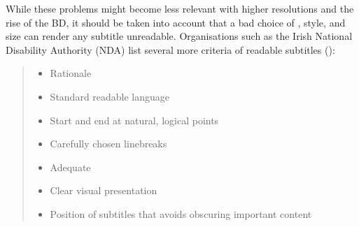 While these problems might become less relevant with higher resolutions and the rise of the BD, it should be taken into account that a bad choice of , style, and size can render any subtitle unreadable. Organisations such as the Irish National Disability Authority (NDA) list several more criteria of readable subtitles (\citealt{nda????}):

\begin{quote}
\begin{itemize}
\item Rationale
\item Standard readable language
\item Start and end at natural, logical points
\item Carefully chosen linebreaks
\item Adequate 
\item Clear visual presentation
\item Position of subtitles that avoids obscuring important content
\end{itemize}
\end{quote}


